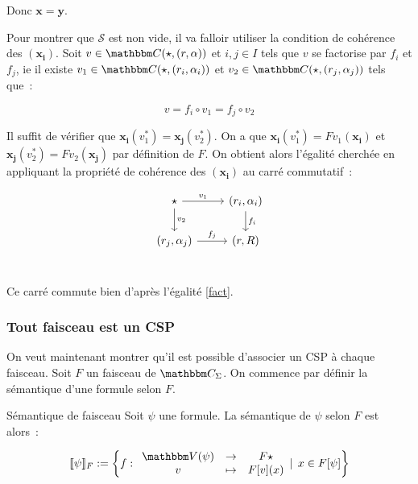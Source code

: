 \begin{pv}
    Donc $\mathbf{x} = \mathbf{y}$.

    Pour montrer que $\mathscr{S}$ est non vide, il va falloir utiliser la condition de
    cohérence des $(\mathbf{x_i})$. Soit $v\in\C(\star, (r,\alpha))$ et $i,j\in I$ tels
    que $v$ se factorise par $f_i$ et $f_j$, ie
    il existe $v_1\in\C(\star, (r_i,\alpha_i))$ et $v_2\in\C(\star, (r_j,\alpha_j))$ tels
    que~:
    
    \begin{equation}\label{fact} v = f_i\circ v_1 = f_j\circ v_2 \end{equation}
    
    Il suffit de vérifier que $\mathbf{x_i}(v_1^*) = \mathbf{x_j}(v_2^*)$.
    On a que $\mathbf{x_i}(v_1^*) = Fv_1(\mathbf{x_i})$ et
    $\mathbf{x_j}(v_2^*) = Fv_2(\mathbf{x_j})$ par définition de $F$. On obtient alors
    l'égalité cherchée en appliquant la propriété de cohérence des $(\mathbf{x_i})$
    au carré commutatif~:

    \[\begin{tikzcd}
        \star \arrow[r, "v_1"] \arrow[d, "v_2"] & (r_i,\alpha_i) \arrow[d, "f_i"] \\
        (r_j,\alpha_j) \arrow[r, "f_j"] & (r,R) \\
    \end{tikzcd}\]

    Ce carré commute bien d'après l'égalité \ref{fact}.
\end{pv}

\subsubsection{Tout faisceau est un CSP}

On veut maintenant montrer qu'il est possible d'associer un CSP à chaque faisceau. Soit
$F$ un faisceau de $\C_\Sigma$. On commence par définir la sémantique d'une formule
selon $F$.

\begin{defi}{Sémantique de faisceau}\label{shSem}
    Soit $\psi$ une formule. La sémantique de $\psi$ selon $F$ est alors~:

    \[ \sem{\psi}_F := \left\{ f:\begin{array}{ccc}
            \V(\psi) & \rightarrow & F\star \\
            v        & \mapsto     & F[v](x) \\
    \end{array}\Large|~x\in F[\psi] \right\}\]
\end{defi}

